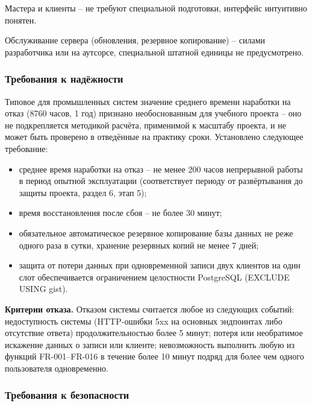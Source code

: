 Мастера и клиенты -- не требуют специальной подготовки, интерфейс интуитивно понятен.

Обслуживание сервера (обновления, резервное копирование) -- силами разработчика или на аутсорсе, специальной штатной единицы не предусмотрено.

\subsubsection{Требования к надёжности}

Типовое для промышленных систем значение среднего времени наработки на отказ (8760 часов, 1 год) признано необоснованным для учебного проекта -- оно не подкрепляется методикой расчёта, применимой к масштабу проекта, и не может быть проверено в отведённые на практику сроки. Установлено следующее требование:

\begin{itemize}
  \item среднее время наработки на отказ -- не менее 200 часов непрерывной работы в период опытной эксплуатации (соответствует периоду от развёртывания до защиты проекта, раздел 6, этап 5);
  \item время восстановления после сбоя -- не более 30 минут;
  \item обязательное автоматическое резервное копирование базы данных не реже одного раза в сутки, хранение резервных копий не менее 7 дней;
  \item защита от потери данных при одновременной записи двух клиентов на один слот обеспечивается ограничением целостности PostgreSQL (EXCLUDE USING gist).
\end{itemize}

\textbf{Критерии отказа.} Отказом системы считается любое из следующих событий: недоступность системы (HTTP-ошибки 5xx на основных эндпоинтах либо отсутствие ответа) продолжительностью более 5 минут; потеря или необратимое искажение данных о записи или клиенте; невозможность выполнить любую из функций FR-001--FR-016 в течение более 10 минут подряд для более чем одного пользователя одновременно.

\subsubsection{Требования к безопасности}

